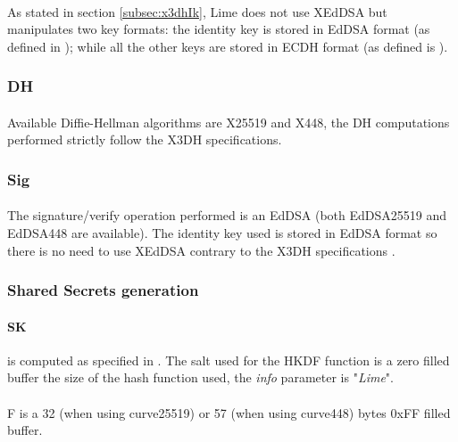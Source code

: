 \documentclass[a4paper,11pt]{article}
\begin{document}
    \paragraph*{}As stated in section \ref{subsec:x3dhIk}, Lime does not use XEdDSA but manipulates two key formats: the identity key is stored in EdDSA format (as defined in \cite{rfc8032}); while all the other keys are stored in ECDH format (as defined is \cite{rfc7748}).
    \subsubsection{DH}
      \paragraph*{}Available Diffie-Hellman algorithms are X25519 and X448, the DH computations performed strictly follow the X3DH specifications.
    \subsubsection{Sig}
      \paragraph*{}The signature/verify operation performed is an EdDSA (both EdDSA25519 and EdDSA448 are available). The identity key used is stored in EdDSA format so there is no need to use XEdDSA contrary to the X3DH specifications \cite[section 2.2]{x3dh}.
    \subsubsection{Shared Secrets generation}
      \paragraph{SK}is computed as specified in \cite[section 3.3 and 2.2]{x3dh}. The salt used for the HKDF function is a zero filled buffer the size of the hash function used, the \textit{info} parameter is "\textit{Lime}".
        \paragraph*{}F is a 32 (when using curve25519) or 57 (when using curve448) bytes 0xFF filled buffer.
\end{document}
